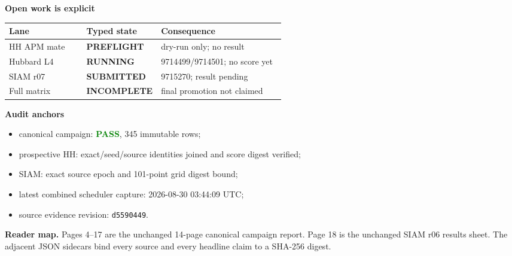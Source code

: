 \documentclass[9pt,letterpaper,landscape]{article}
\newcommand{\good}[1]{\textcolor{green}{\textbf{#1}}}
\newcommand{\pending}[1]{\textcolor{amber}{\textbf{#1}}}
\newcommand{\statusbox}[2]{\colorbox{#1}{\parbox{0.965\linewidth}{\strut #2\strut}}}
\begin{document}
\begin{minipage}[t]{0.42\linewidth}
{\large\bfseries\color{navy}Open work is explicit}

\small
\begin{tabularx}{\linewidth}{@{}p{0.28\linewidth}p{0.27\linewidth}Y@{}}
\toprule
Lane & Typed state & Consequence \\
\midrule
HH APM mate & \pending{PREFLIGHT} & dry-run only; no result \\
Hubbard L4 & \pending{RUNNING} & 9714499/9714501; no score yet \\
SIAM r07 & \pending{SUBMITTED} & 9715270; result pending \\
Full matrix & \pending{INCOMPLETE} & final promotion not claimed \\
\bottomrule
\end{tabularx}
\normalsize

\vspace{7pt}
{\large\bfseries\color{navy}Audit anchors}
\begin{itemize}
  \item canonical campaign: \good{PASS}, 345 immutable rows;
  \item prospective HH: exact/seed/source identities joined and score digest verified;
  \item SIAM: exact source epoch and 101-point grid digest bound;
  \item latest combined scheduler capture: 2026-08-30 03:44:09 UTC;
  \item source evidence revision: \texttt{d5590449}.
\end{itemize}
\end{minipage}

\vfill
\statusbox{pale}{\textbf{Reader map.} Pages 4--17 are the unchanged 14-page canonical campaign report. Page 18 is the unchanged SIAM r06 results sheet. The adjacent JSON sidecars bind every source and every headline claim to a SHA-256 digest.}
\end{document}

